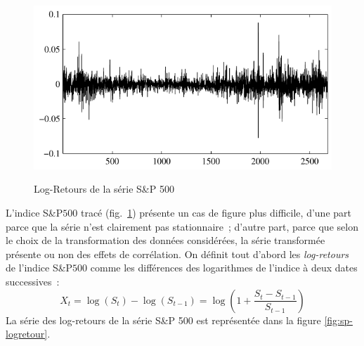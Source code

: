 \begin{figure}
  \centering
  \includegraphics[width=\textwidth]{Figures/logretourSP}\\
  \caption{Log-Retours de la s\'erie S\&P 500}\label{fig:SP}
\end{figure}
 L'indice S\&P$500$ trac\'e (fig.~\ref{fig:SP}) pr\'esente un cas de figure plus
 difficile, d'une part parce que la s\'erie n'est clairement pas
 stationnaire~; d'autre part, parce que selon le choix de la transformation des
 donn\'ees consid\'er\'ees, la s\'erie transform\'ee pr\'esente ou non des effets de
 corr\'elation. On d\'efinit tout d'abord les \emph{log-retours} de l'indice
 S\&P$500$ comme les diff\'erences des logarithmes de l'indice \`a deux dates
 successives~:
\[
 X_{t} = \log( S_{t}) - \log(S_{t-1})
      = \log \left( 1 + \frac{S_{t}-S_{t-1}}{S_{t-1}} \right)
\]
La s\'erie des log-retours de la s\'erie S\&P 500 est repr\'esent\'ee dans la
figure \ref{fig:sp-logretour}.

